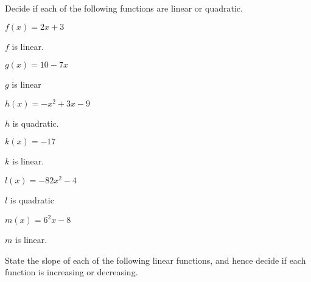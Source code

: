	 \begin{exercises}
	 \begin{problem}
	 Decide if each of the following functions are linear or quadratic.
	 \begin{multicols}{3}
		 \begin{subproblem}
			 $f(x)=2x+3$
			 \begin{shortsolution}
				 $f$ is linear.
			 \end{shortsolution}
		 \end{subproblem}
		 \begin{subproblem}
			 $g(x)=10-7x$
			 \begin{shortsolution}
				 $g$ is linear
			 \end{shortsolution}
		 \end{subproblem}
		 \begin{subproblem}
			 $h(x)=-x^2+3x-9$
			 \begin{shortsolution}
				 $h$ is quadratic.
			 \end{shortsolution}
		 \end{subproblem}
		 \begin{subproblem}
			 $k(x)=-17$
			 \begin{shortsolution}
				 $k$ is linear.
			 \end{shortsolution}
		 \end{subproblem}
		 \begin{subproblem}
			 $l(x)=-82x^2-4$
			 \begin{shortsolution}
				 $l$ is quadratic
			 \end{shortsolution}
		 \end{subproblem}
		 \begin{subproblem}
			 $m(x)=6^2x-8$
			 \begin{shortsolution}
				 $m$ is linear.
			 \end{shortsolution}
		 \end{subproblem}
	 \end{multicols}
	 \end{problem}
	 \begin{problem}
	 State the slope of each of the following linear functions, and
	 hence decide if each function is increasing or decreasing.

\end{problem}
\end{exercises}
